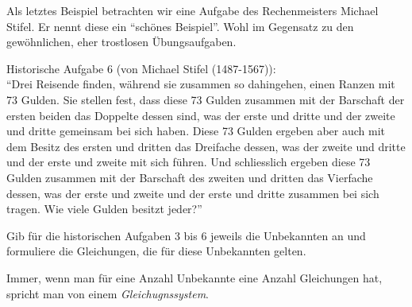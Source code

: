\documentclass[11pt,oneside]{article}
\begin{document}
	Als letztes Beispiel betrachten wir eine Aufgabe des Rechenmeisters Michael Stifel. Er nennt diese ein "`schönes Beispiel"'. Wohl im Gegensatz zu den gewöhnlichen, eher trostlosen Übungsaufgaben.
	\begin{center}
		\begin{framed}
			Historische Aufgabe 6 (von Michael Stifel (1487-1567)):\\

			"`Drei Reisende finden, während sie zusammen so dahingehen, einen Ranzen mit 73 Gulden. Sie stellen fest, dass diese 73 Gulden zusammen mit der Barschaft der ersten beiden das Doppelte dessen sind, was der erste und dritte und der zweite und dritte gemeinsam bei sich haben. Diese 73 Gulden ergeben aber auch mit dem Besitz des ersten und dritten das Dreifache dessen, was der zweite und dritte und der erste und zweite mit sich führen. Und schliesslich ergeben diese 73 Gulden zusammen mit der Barschaft des zweiten und
			dritten das Vierfache dessen, was der erste und zweite und der erste
			und dritte zusammen bei sich tragen. Wie viele Gulden besitzt jeder?"'
		\end{framed}
	\end{center}
	\begin{aufgabe}
		Gib für die historischen Aufgaben 3 bis 6 jeweils die Unbekannten an und formuliere die Gleichungen, die für diese Unbekannten gelten.
	\end{aufgabe}

	\begin{definition}[Gleichungssystem]
		Immer, wenn man für eine Anzahl Unbekannte eine Anzahl Gleichungen hat, spricht man von einem \emph{Gleichugnssystem}.
	\end{definition}
	\newpage
\end{document}
